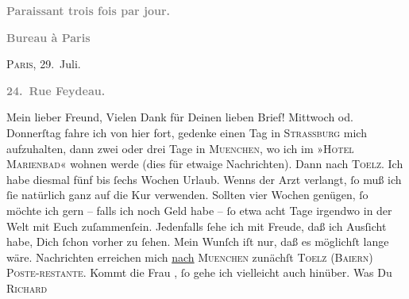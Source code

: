 \begin{ledgroupsized}[t]{13cm}
           \pstart
           \begin{otherlanguage}{french}\textcolor{gray}{\textbf{\textbf{Paraissant trois fois par jour.}}}\end{otherlanguage}\pend
           \pstart
           \begin{otherlanguage}{french}\textcolor{gray}{\textbf{\textbf{Bureau à Paris}}}\end{otherlanguage}\hfill \textsc{Paris}, 29. Juli.\pend
           \pstart
           \begin{otherlanguage}{french}\textcolor{gray}{\textbf{\textbf{24. Rue Feydeau.}}}\end{otherlanguage}\pend
           \pstart\center{}Mein lieber Freund,\pend\pstart
           Vielen Dank für Deinen lieben Brief! \pend
           \pstart
           Mittwoch od. Donnerſtag
               fahre ich von hier fort, gedenke einen Tag in \textsc{Strassburg} mich aufzuhalten, dann zwei oder drei Tage in \textsc{Muenchen}, wo ich im »\textsc{Hotel Marienbad}« wohnen werde (dies für etwaige Nachrichten). Dann nach \textsc{Toelz}. Ich habe diesmal {\pb}fünf bis ſechs Wochen
               Urlaub. Wenns der Arzt verlangt, ſo muß ich ſie natürlich ganz auf die Kur verwenden.
               Sollten vier Wochen genügen, ſo möchte ich gern – falls ich noch Geld habe – ſo etwa
               acht Tage irgendwo in der Welt mit Euch zuſammenſein. Jedenfalls ſehe ich mit Freude,
               daß ich Ausſicht habe, Dich ſchon vorher zu ſehen. Mein Wunſch iſt nur, daß es
               möglichſt lange wäre. Nachrichten erreichen mich {\pb}\uline{nach}{ }\textsc{Muenchen} zunächſt \textsc{Toelz} (\textsc{Baiern}) \textsc{Poste-restante}. Kommt die Frau \label{K_L02742-1v}\label{K_L02742-1h}, ſo gehe ich vielleicht auch hinüber. Was Du \textsc{Richard}{ }\label{K_L02742-2v}
\end{ledgroupsized}
